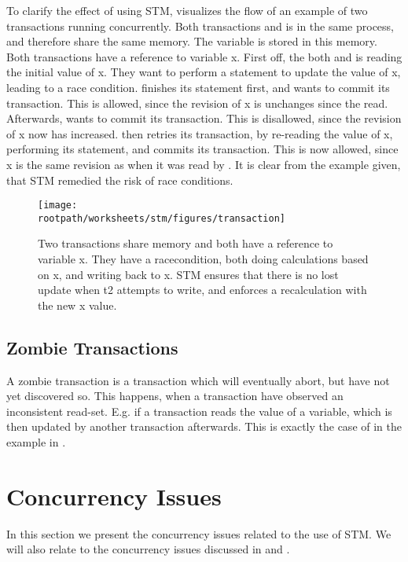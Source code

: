 To clarify the effect of using \ac{STM},  visualizes the flow of an example of two transactions running concurrently. Both transactions  and  is in the same process, and therefore share the same memory. The variable  is stored in this memory. Both transactions have a reference to variable x. First off, the both  and  is reading the initial value of x. They want to perform a statement to update the value of x, leading to a race condition.  finishes its statement first, and wants to commit its transaction. This is allowed, since the revision of x is unchanges since the read. Afterwards,  wants to commit its transaction. This is disallowed, since the revision of x now has increased.  then retries its transaction, by re-reading the value of x, performing its statement, and commits its transaction. This is now allowed, since x is the same revision as when it was read by . It is clear from the example given, that \ac{STM} remedied the risk of race conditions.

\begin{figure}[h!]
\centering
\texttt{[image: \\rootpath/worksheets/stm/figures/transaction]}
\caption{Two transactions share memory and both have a reference to variable x. They have a racecondition, both doing calculations based on x, and writing back to x. \ac{STM} ensures that there is no lost update when t2 attempts to write, and enforces a recalculation with the new x value.}\label{fig:transaction}
\end{figure}

\subsection{Zombie Transactions}
\label{subsec:zombie}
A zombie transaction is a transaction which will eventually abort, but have not yet discovered so. This happens, when a transaction have observed an inconsistent read-set\cite[p. 196]{dice2006transactional}. E.g. if a transaction reads the value of a variable, which is then updated by another transaction afterwards. This is exactly the case of  in the example in .

\section{Concurrency Issues}
In this section we present the concurrency issues related to the use of \ac{STM}. We will also relate to the concurrency issues discussed in  and .
\label{sec:stm_issues}

